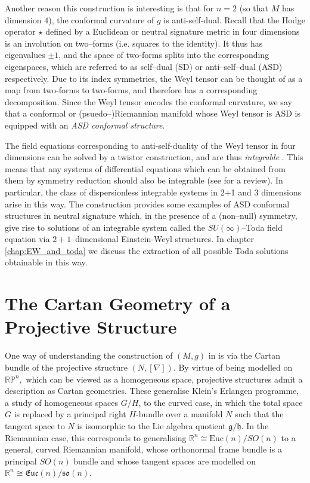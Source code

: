 Another reason this construction is interesting is that for $n=2$ (so that $M$ has dimension $4$), the conformal
curvature of $g$ is anti-self-dual. Recall that the Hodge operator
$\star$ defined by a Euclidean or neutral signature metric in four
dimensions is an involution on two--forms (i.e. squares to the identity).
It thus has eigenvalues $\pm1$, and the space of two-forms splits
into the corresponding eigenspaces, which are referred to as self--dual
(SD) or anti--self--dual (ASD) respectively. Due to its index symmetries,
the Weyl tensor can be thought of as a map from two-forms to two-forms,
and therefore has a corresponding decomposition. Since the Weyl tensor
encodes the conformal curvature, we say that a conformal or (psuedo--)Riemannian
manifold whose Weyl tensor is ASD is equipped with an \textit{ASD
conformal structure}.

The field equations corresponding to anti-self-duality of the Weyl
tensor in four dimensions can be solved by a twistor construction,
and are thus \textit{integrable} \cite{ward}. This means that any systems of differential
equations which can be obtained from them by symmetry reduction should
also be integrable (see \cite{MW} for a review). In particular, the class of dispersionless
integrable systems in 2+1 and 3 dimensions arise in this way. The
construction \cite{DM} provides some examples of
ASD conformal structures in neutral signature which, in the presence
of a (non--null) symmetry, give rise to solutions of an integrable
system called the $SU(\infty)$--Toda field equation via $2+1$--dimensional
Einstein-Weyl structures. In chapter \ref{chap:EW_and_toda} we discuss the extraction
of all possible Toda solutions obtainable in this way.






\section{The Cartan Geometry of a Projective Structure}

One way of understanding the construction of $(M,g)$ in \cite{DM}
is via the Cartan bundle of the projective structure $(N,[\nabla])$.
By virtue of being modelled on $\mathbb{RP}^{n},$ which can be viewed
as a homogeneous space, projective structures admit a description
as Cartan geometries. These generalise Klein's Erlangen programme,
a study of homogeneous spaces $G/H$, to the curved case, in which
the total space $G$ is replaced by a principal right $H$-bundle
over a manifold $N$ such that the tangent space to $N$ is isomorphic
to the Lie algebra quotient $\mathfrak{g}/\mathfrak{h}$. In the Riemannian
case, this corresponds to generalising $\mathbb{R}^{n}\cong\mathrm{Euc}(n)/SO(n)$
to a general, curved Riemannian manifold, whose orthonormal frame
bundle is a principal $SO(n)$ bundle and whose tangent spaces are
modelled on $\mathbb{R}^{n}\cong\mathfrak{Euc}(n)/\mathfrak{so}(n)$.

